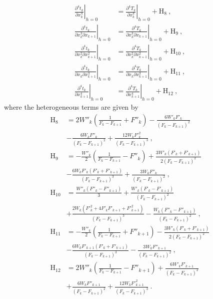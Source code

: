 \begin{align}
\left. \frac{\partial^4 t_k }{\partial x_k^4}\right\rvert_{h=0} & = \left. \frac{\partial^4 T_k }{\partial x_k^4}\right\rvert_{h=0} + \text{H}_8~,\\
\nonumber
\left. \frac{\partial^4 t_k }{\partial x_k^3 \partial x_{k+1}}\right\rvert_{h=0} & = \left. \frac{\partial^4 T_k }{\partial x_k^3 \partial x_{k+1}}\right\rvert_{h=0}  + \text{H}_9~,\\
\nonumber
\left. \frac{\partial^4 t_k }{\partial x_k^2 \partial x_{k+1}^2}\right\rvert_{h=0} & = \left. \frac{\partial^4 T_k }{\partial x_k^2 \partial x_{k+1}^2}\right\rvert_{h=0} + \text{H}_{10}~,\\
\nonumber
\left. \frac{\partial^4 t_k }{\partial x_k \partial x_{k+1}^3}\right\rvert_{h=0} & = \left. \frac{\partial^4 T_k }{\partial x_k \partial x_{k+1}^3}\right\rvert_{h=0} + \text{H}_{11}~,\\
\nonumber
\left. \frac{\partial^4 t_k }{\partial x_{k+1}^4}\right\rvert_{h=0} & = \left. \frac{\partial^4 T_k }{\partial x_{k+1}^4}\right\rvert_{h=0} + \text{H}_{12}~,
\end{align}
where the heterogeneous terms are given by
\begin{align}
\text{H}_8 &  =  2W''_k\left(\frac{1}{F_k-F_{k+1}} + F''_{k} \right) - \frac{6W'_k F'_k}{(F_k-F_{k+1})^2} \\
\nonumber
\nonumber
& - \frac{6 W_k F''_{k} }{(F_k-F_{k+1})^2} + \frac{12 W_k F'^2_{k} }{(F_k-F_{k+1})^3} ~,\\
\nonumber
\text{H}_9 &  =   -\frac{W''_k}{2} \left(\frac{1}{F_k-F_{k+1}} - F''_{k} \right) + \frac{3W'_k(F'_k+F'_{k+1})}{2(F_k-F_{k+1})^2}\\
\nonumber
&  - \frac{6 W_k F'_{k}(F'_k+F'_{k+1}) }{(F_k-F_{k+1})^3}  + \frac{3 W_k F''_{k} }{(F_k-F_{k+1})^2} ~,\\
\nonumber
\text{H}_{10} &  =  \frac{W''_k(F''_k-F''_{k+1})}{3} + \frac{W'_k(F'_k-F'_{k+1})}{(F_k-F_{k+1})^2} \\
\nonumber
& + \frac{2W_k (F'^2_k + 4F'_k F'_{k+1} + F'^2_{k+1}) }{(F_k-F_{k+1})^3} - \frac{W_k (F''_k - F''_{k+1}) }{(F_k-F_{k+1})^2}~,\\
\nonumber
\text{H}_{11} &  =  -\frac{W''_k}{2} \left(\frac{1}{F_k-F_{k+1}} + F''_{k+1} \right) - \frac{3W'_k(F'_k+F'_{k+1})}{2(F_k-F_{k+1})^2} \\
\nonumber
&  - \frac{6 W_k F'_{k+1}(F'_k+F'_{k+1}) }{(F_k-F_{k+1})^3}  - \frac{3 W_k F''_{k+1} }{(F_k-F_{k+1})^2} ~,\\
\nonumber
\text{H}_{12} &  =   2W''_k\left(\frac{1}{F_k-F_{k+1}} - F''_{k+1} \right) + \frac{6W'_k F'_{k+1}}{(F_k-F_{k+1})^2} \\
\nonumber
& + \frac{6 W_k F''_{k+1} }{(F_k-F_{k+1})^2} + \frac{12 W_k F'^2_{k+1} }{(F_k-F_{k+1})^3} ~.
\end{align}



